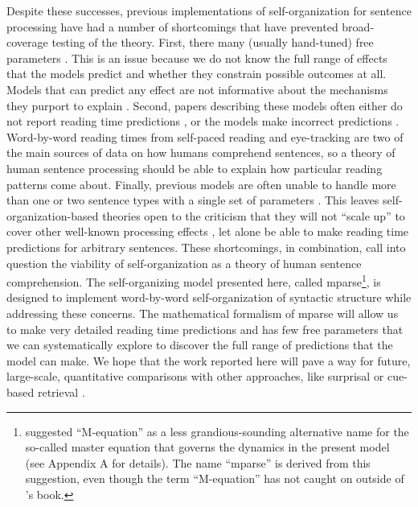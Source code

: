 \documentclass[a4paper, 12pt]{article}
\begin{document}
Despite these successes, previous implementations of self-organization for
sentence processing have had a number of shortcomings that have prevented
broad-coverage testing of the theory. First, there many (usually hand-tuned)
free parameters \citep{tabor2004evidence, kempen1989incremental,
    smith2018toward, smith2018self}. This is an issue because we do not know
the full range of effects that the models predict and whether they constrain
possible outcomes at all. Models that can predict any effect are not
informative about the mechanisms they purport to explain
\citep{roberts2000how}. Second, papers describing these models often either do
not report reading time predictions \citep{smith2018self}, or the models make
incorrect predictions \citep{kempen1989incremental}. Word-by-word reading times
from self-paced reading and eye-tracking are two of the main sources of data on
how humans comprehend sentences, so a theory of human sentence processing
should be able to explain how particular reading patterns come about. Finally,
previous models are often unable to handle more than one or two sentence types
with a single set of parameters \citep{smith2018self, smith2018toward,
    tabor2004evidence}. This leaves self-organization-based theories open to
the criticism that they will not ``scale up'' to cover other well-known
processing effects \citep[e.g.,][]{bicknell2009model}, let alone be able to
make reading time predictions for arbitrary sentences. These shortcomings, in
combination, call into question the viability of self-organization as a theory
of human sentence comprehension. The self-organizing model presented here,
called mparse\footnote{\citet{vankampen2007stochastic} suggested ``M-equation''
    as a less grandious-sounding  alternative name for the so-called master
    equation that governs the dynamics in the present model (see Appendix A for
    details). The name ``mparse'' is derived from this suggestion, even though
    the term ``M-equation'' has not caught on outside of
    \citeauthor{vankampen2007stochastic}'s book.}, is designed to implement
word-by-word self-organization of syntactic structure while addressing these
concerns. The mathematical formalism of mparse will allow us to make very
detailed reading time predictions and has few free parameters that we can
systematically explore to discover the full range of predictions that the model
can make. We hope that the work reported here will pave a way for future,
large-scale, quantitative comparisons with other approaches, like surprisal
\citep{hale2001probabilistic, levy2008expectation} or cue-based retrieval
\citep{lewis2005activation}.
\end{document}
